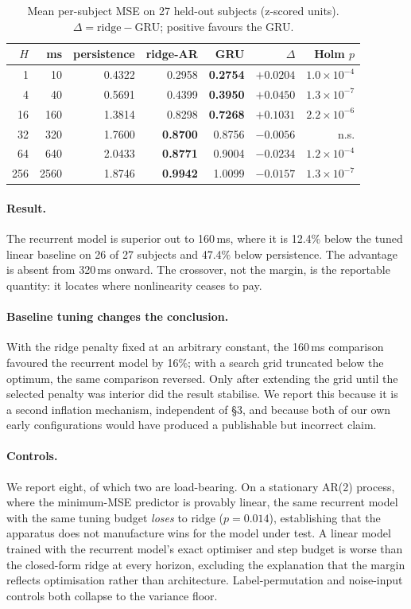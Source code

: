 \documentclass{article}
\begin{document}
\begin{table}[t]
\centering\small
\caption{Mean per-subject MSE on 27 held-out subjects (z-scored units).
$\Delta = \text{ridge} - \text{GRU}$; positive favours the GRU.}
\begin{tabular}{rrrrrrr}
\toprule
$H$ & ms & persistence & ridge-AR & GRU & $\Delta$ & Holm $p$ \\
\midrule
1   & 10   & 0.4322 & 0.2958 & \textbf{0.2754} & $+0.0204$ & $1.0\times10^{-4}$ \\
4   & 40   & 0.5691 & 0.4399 & \textbf{0.3950} & $+0.0450$ & $1.3\times10^{-7}$ \\
16  & 160  & 1.3814 & 0.8298 & \textbf{0.7268} & $+0.1031$ & $2.2\times10^{-6}$ \\
32  & 320  & 1.7600 & \textbf{0.8700} & 0.8756 & $-0.0056$ & n.s. \\
64  & 640  & 2.0433 & \textbf{0.8771} & 0.9004 & $-0.0234$ & $1.2\times10^{-4}$ \\
256 & 2560 & 1.8746 & \textbf{0.9942} & 1.0099 & $-0.0157$ & $1.3\times10^{-7}$ \\
\bottomrule
\end{tabular}
\label{tab:bench}
\end{table}

\paragraph{Result.} The recurrent model is superior out to 160\,ms, where it is
12.4\% below the tuned linear baseline on 26 of 27 subjects and 47.4\% below
persistence. The advantage is absent from 320\,ms onward. The crossover, not the
margin, is the reportable quantity: it locates where nonlinearity ceases to pay.

\paragraph{Baseline tuning changes the conclusion.} With the ridge penalty fixed at
an arbitrary constant, the 160\,ms comparison favoured the recurrent model by 16\%;
with a search grid truncated below the optimum, the same comparison reversed. Only
after extending the grid until the selected penalty was interior did the result
stabilise. We report this because it is a second inflation mechanism, independent
of \S3, and because both of our own early configurations would have produced a
publishable but incorrect claim.

\paragraph{Controls.} We report eight, of which two are load-bearing. On a
stationary AR(2) process, where the minimum-MSE predictor is provably linear, the
same recurrent model with the same tuning budget \emph{loses} to ridge
($p=0.014$), establishing that the apparatus does not manufacture wins for the
model under test. A linear model trained with the recurrent model's exact optimiser
and step budget is worse than the closed-form ridge at every horizon, excluding the
explanation that the margin reflects optimisation rather than architecture.
Label-permutation and noise-input controls both collapse to the variance floor.
\end{document}

